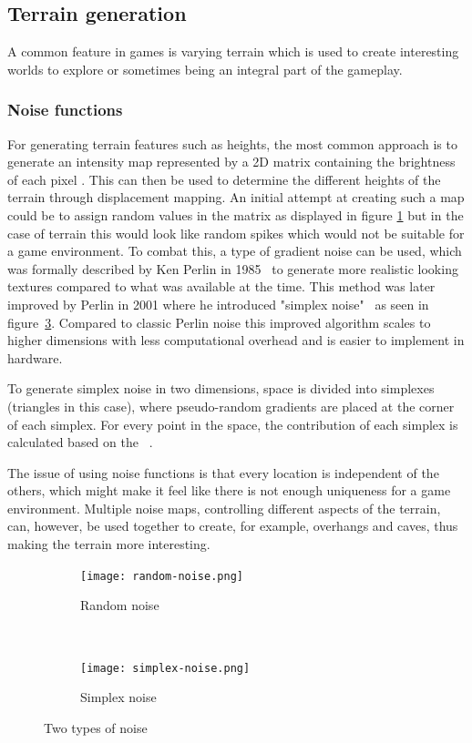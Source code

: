 \subsection{Terrain generation}
A common feature in games is varying terrain which is used to create interesting worlds to explore or sometimes being an integral part of the gameplay.

\subsubsection {Noise functions}
For generating terrain features such as heights, the most common approach is to generate an intensity map represented by a 2D matrix containing the brightness of each pixel \cite[pp. 58-59]{shaker2016procedural}. This can then be used to determine the different heights of the terrain through displacement mapping. An initial attempt at creating such a map could be to assign random values in the matrix as displayed in figure \ref{fig:random-noise} but in the case of terrain this would look like random spikes which would not be suitable for a game environment. To combat this, a type of gradient noise can be used, which was formally described by Ken Perlin in 1985~\cite{image-synthesizer} to generate more realistic looking textures compared to what was available at the time. This method was later improved by Perlin in 2001 where he introduced "simplex noise"~\cite{improving-noise} as seen in figure~\ref{fig:simplex-noise}. Compared to classic Perlin noise this improved algorithm scales to higher dimensions with less computational overhead and is easier to implement in hardware. 

To generate simplex noise in two dimensions, space is divided into simplexes (triangles in this case), where pseudo-random gradients are placed at the corner of each simplex. For every point in the space, the contribution of each simplex is calculated based on the ~\cite{simplex-demystified}.

The issue of using noise functions is that every location is independent of the others, which might make it feel like there is not enough uniqueness for a game environment. Multiple noise maps, controlling different aspects of the terrain, can, however, be used together to create, for example, overhangs and caves, thus making the terrain more interesting.

\begin{figure}[H]
\centering
\begin{subfigure}{.3\linewidth}
  \centering
  \texttt{[image: random-noise.png]}
  \caption{Random noise}
  \label{fig:random-noise}
\end{subfigure}
~
\begin{subfigure}{.3\linewidth}
  \centering
  \texttt{[image: simplex-noise.png]}
  \caption{Simplex noise}
  \label{fig:simplex-noise}
\end{subfigure}
\caption{Two types of noise}
\end{figure}

